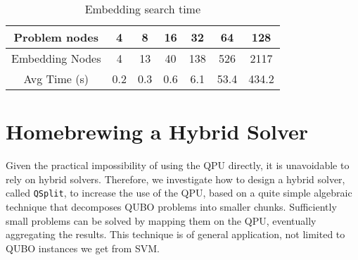 \documentclass{ceurart}
\begin{document}
\begin{table}
    \caption{Embedding search time}
    \label{tab:embedding}
    \begin{tabular}{ccccccc}
        \toprule
        Problem nodes & 4 & 8 & 16 & 32 & 64 & 128 \\  
        \midrule
        Embedding Nodes & 4 & 13 & 40 & 138 & 526 & 2117 \\
        Avg Time (s) & 0.2 & 0.3 & 0.6 & 6.1 & 53.4 & 434.2 \\
        \bottomrule
    \end{tabular}
\end{table}

\section{Homebrewing a Hybrid Solver}

Given the practical impossibility of using the QPU directly, it is unavoidable to rely on hybrid solvers. Therefore, we investigate how to design a hybrid solver, called \verb|QSplit|, to increase the use of the QPU, based on a quite simple algebraic technique that decomposes QUBO problems into smaller chunks. Sufficiently small problems can be solved by mapping them on the QPU, eventually aggregating the results. This technique is of general application, not limited to QUBO instances we get from SVM.
\end{document}
